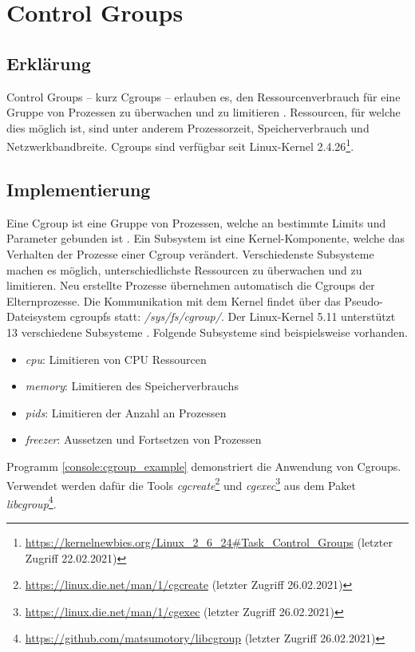 \section{Control Groups}
\label{lab:cgroups}

\subsection{Erklärung}
Control Groups – kurz Cgroups – erlauben es, den Ressourcenverbrauch für eine
Gruppe von Prozessen zu überwachen und zu limitieren \cite{man_cgroups}.
Ressourcen, für welche dies möglich ist, sind unter anderem Prozessorzeit,
Speicherverbrauch und Netzwerkbandbreite. Cgroups sind verfügbar seit
Linux-Kernel
2.4.26\footnote{\url{https://kernelnewbies.org/Linux\_2\_6\_24\#Task\_Control\_Groups}
(letzter Zugriff 22.02.2021)}.

\subsection{Implementierung}
Eine Cgroup ist eine Gruppe von Prozessen, welche an bestimmte Limits und
Parameter gebunden ist \cite{man_cgroups}. Ein Subsystem ist eine
Kernel-Komponente, welche das Verhalten der Prozesse einer Cgroup verändert.
Verschiedenste Subsysteme machen es möglich, unterschiedlichste Ressourcen zu
überwachen und zu limitieren. Neu erstellte Prozesse übernehmen automatisch die
Cgroups der Elternprozesse. Die Kommunikation mit dem Kernel findet über das
Pseudo-Dateisystem cgroupfs statt: \emph{/sys/fs/cgroup/}. Der Linux-Kernel
5.11 unterstützt 13 verschiedene Subsysteme \cite{man_cgroups}. Folgende
Subsysteme sind beispielsweise vorhanden. 

\begin{itemize}
  \item \emph{cpu}: Limitieren von CPU Ressourcen
  \item \emph{memory}: Limitieren des Speicherverbrauchs
  \item \emph{pids}: Limitieren der Anzahl an Prozessen 
  \item \emph{freezer}: Aussetzen und Fortsetzen von Prozessen
\end{itemize}

Programm \ref{console:cgroup_example} demonstriert die Anwendung von Cgroups.
Verwendet werden dafür die Tools
\emph{cgcreate}\footnote{\url{https://linux.die.net/man/1/cgcreate} (letzter
Zugriff 26.02.2021)} und
\emph{cgexec}\footnote{\url{https://linux.die.net/man/1/cgexec} (letzter
Zugriff 26.02.2021)} aus dem Paket
\emph{libcgroup}\footnote{\url{https://github.com/matsumotory/libcgroup}
(letzter Zugriff 26.02.2021)}.


